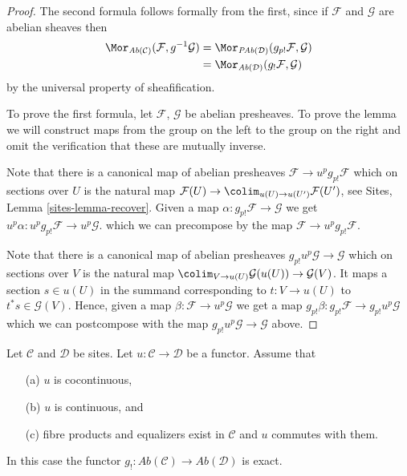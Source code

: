 \begin{proof}
The second formula follows formally from the first, since if
$\mathcal{F}$ and $\mathcal{G}$ are abelian sheaves then
\begin{align*}
\Mor_{\textit{Ab}(\mathcal{C})}(\mathcal{F}, g^{-1}\mathcal{G})
& =
\Mor_{\textit{PAb}(\mathcal{D})}(g_{p!}\mathcal{F}, \mathcal{G}) \\
& =
\Mor_{\textit{Ab}(\mathcal{D})}(g_!\mathcal{F}, \mathcal{G})
\end{align*}
by the universal property of sheafification.

\medskip\noindent
To prove the first formula, let $\mathcal{F}$, $\mathcal{G}$ be abelian
presheaves. To prove the lemma we will construct maps from the group on the
left to the group on the right and omit the verification that these are
mutually inverse.

\medskip\noindent
Note that there is a canonical map of abelian presheaves
$\mathcal{F} \to u^pg_{p!}\mathcal{F}$ which on sections over $U$ is the
natural map
$\mathcal{F}(U) \to \colim_{u(U) \to u(U')} \mathcal{F}(U')$, see
Sites, Lemma \ref{sites-lemma-recover}.
Given a map $\alpha : g_{p!}\mathcal{F} \to \mathcal{G}$
we get $u^p\alpha : u^pg_{p!}\mathcal{F} \to u^p\mathcal{G}$.
which we can precompose by the map $\mathcal{F} \to u^pg_{p!}\mathcal{F}$.

\medskip\noindent
Note that there is a canonical map of abelian presheaves
$g_{p!}u^p\mathcal{G} \to \mathcal{G}$ which on sections over
$V$ is the natural map
$\colim_{V \to u(U)} \mathcal{G}(u(U)) \to \mathcal{G}(V)$.
It maps a section $s \in u(U)$ in the summand corresponding to
$t : V \to u(U)$ to $t^*s \in \mathcal{G}(V)$.
Hence, given a map $\beta : \mathcal{F} \to u^p\mathcal{G}$
we get a map $g_{p!}\beta : g_{p!}\mathcal{F} \to g_{p!}u^p\mathcal{G}$
which we can postcompose with the map $g_{p!}u^p\mathcal{G} \to \mathcal{G}$
above.
\end{proof}

\begin{lemma}
\label{lemma-exactness-lower-shriek}
Let $\mathcal{C}$ and $\mathcal{D}$ be sites.
Let $u : \mathcal{C} \to \mathcal{D}$ be a functor.
Assume that
\begin{enumerate}
\item[(a)] $u$ is cocontinuous,
\item[(b)] $u$ is continuous, and
\item[(c)] fibre products and equalizers exist in $\mathcal{C}$ and
$u$ commutes with them.
\end{enumerate}
In this case the functor
$g_! : \textit{Ab}(\mathcal{C}) \to \textit{Ab}(\mathcal{D})$
is exact.
\end{lemma}

